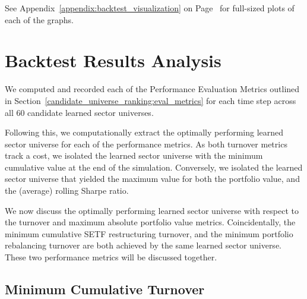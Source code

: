 \documentclass[../main.tex]{subfiles}
\begin{document}
See Appendix~\ref{appendix:backtest_visualization} on Page~\pageref{appendix:backtest_visualization} for full-sized plots of each of the graphs.


\section{Backtest Results Analysis}

We computed and recorded each of the Performance Evaluation Metrics outlined in Section~\ref{candidate_universe_ranking:eval_metrics} for each time step across all 60 candidate learned sector universes.

Following this, we computationally extract the optimally performing learned sector universe for each of the performance metrics. As both turnover metrics track a cost, we isolated the learned sector universe with the minimum cumulative value at the end of the simulation. Conversely, we isolated the learned sector universe that yielded the maximum value for both the portfolio value, and the (average) rolling Sharpe ratio.

We now discuss the optimally performing learned sector universe with respect to the turnover and maximum absolute portfolio value metrics. Coincidentally, the minimum cumulative SETF restructuring turnover, and the minimum portfolio rebalancing turnover are both achieved by the same learned sector universe. These two performance metrics will be discussed together.

\subsection{Minimum Cumulative Turnover}
\end{document}
